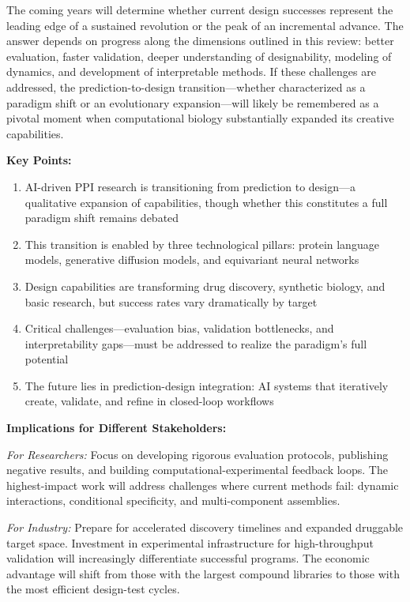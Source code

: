 The coming years will determine whether current design successes represent the leading edge of a sustained revolution or the peak of an incremental advance. The answer depends on progress along the dimensions outlined in this review: better evaluation, faster validation, deeper understanding of designability, modeling of dynamics, and development of interpretable methods. If these challenges are addressed, the prediction-to-design transition---whether characterized as a paradigm shift or an evolutionary expansion---will likely be remembered as a pivotal moment when computational biology substantially expanded its creative capabilities.

\vspace{1em}
\noindent
\textbf{Key Points:}
\begin{enumerate}
    \item AI-driven PPI research is transitioning from prediction to design---a qualitative expansion of capabilities, though whether this constitutes a full paradigm shift remains debated
    \item This transition is enabled by three technological pillars: protein language models, generative diffusion models, and equivariant neural networks
    \item Design capabilities are transforming drug discovery, synthetic biology, and basic research, but success rates vary dramatically by target
    \item Critical challenges---evaluation bias, validation bottlenecks, and interpretability gaps---must be addressed to realize the paradigm's full potential
    \item The future lies in prediction-design integration: AI systems that iteratively create, validate, and refine in closed-loop workflows
\end{enumerate}

\vspace{1em}
\noindent
\textbf{Implications for Different Stakeholders:}

\noindent
\textit{For Researchers:} Focus on developing rigorous evaluation protocols, publishing negative results, and building computational-experimental feedback loops. The highest-impact work will address challenges where current methods fail: dynamic interactions, conditional specificity, and multi-component assemblies.

\noindent
\textit{For Industry:} Prepare for accelerated discovery timelines and expanded druggable target space. Investment in experimental infrastructure for high-throughput validation will increasingly differentiate successful programs. The economic advantage will shift from those with the largest compound libraries to those with the most efficient design-test cycles.

